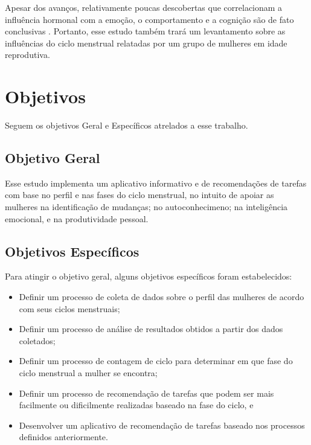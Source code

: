 Apesar dos avanços, relativamente poucas descobertas que correlacionam a influência hormonal com a 
emoção, o comportamento e a cognição são de fato conclusivas \cite{poroma2014}. Portanto, esse estudo 
também trará um levantamento sobre as influências do ciclo menstrual relatadas por um grupo de mulheres 
em idade reprodutiva.


\section{Objetivos}

Seguem os objetivos Geral e Específicos atrelados a esse trabalho.

\subsection{Objetivo Geral}


Esse estudo implementa um aplicativo informativo e de recomendações de tarefas com base no perfil e 
nas fases do ciclo menstrual, no intuito de apoiar as mulheres na identificação de mudanças; 
no autoconhecimeno; na inteligência emocional, e na produtividade pessoal.


\subsection{Objetivos Específicos}

Para atingir o objetivo geral, alguns objetivos específicos foram estabelecidos:

\begin{itemize}

        \item Definir um processo de coleta de dados sobre o perfil das mulheres de acordo com seus ciclos menstruais;
        
        \item Definir um processo de análise de resultados obtidos a partir dos dados coletados;

        \item Definir um processo de contagem de ciclo para determinar em que fase do ciclo menstrual a mulher se encontra;

        \item Definir um processo de recomendação de tarefas que podem ser mais facilmente ou dificilmente realizadas baseado na fase do ciclo, e

        \item Desenvolver um aplicativo de recomendação de tarefas baseado nos processos definidos anteriormente.

\end{itemize}

